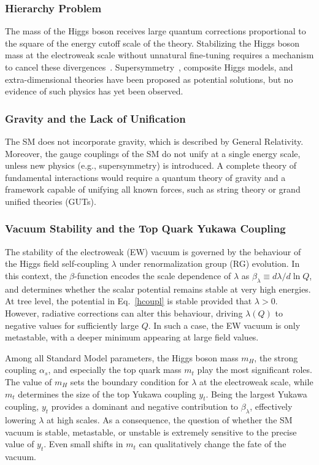 \subsubsection*{Hierarchy Problem}

The mass of the Higgs boson receives large quantum corrections proportional to the square of the energy cutoff scale of the theory. Stabilizing the Higgs boson mass at the electroweak scale without unnatural fine-tuning requires a mechanism to cancel these divergences~\cite{Weinberg:1975gm,Gildener:1976ai,Weinberg:1979bn,Susskind:1978ms}. Supersymmetry~\cite{Dimopoulos:1981zb,Witten:1981nf,Dine:1981za,Dimopoulos:1981au,Sakai:1981gr,Kaul:1981hi}, composite Higgs models, and extra-dimensional theories have been proposed as potential solutions, but no evidence of such physics has yet been observed.

\subsubsection*{Gravity and the Lack of Unification}

The SM does not incorporate gravity, which is described by General Relativity. Moreover, the gauge couplings of the SM do not unify at a single energy scale, unless new physics (e.g., supersymmetry) is introduced. A complete theory of fundamental interactions would require a quantum theory of gravity and a framework capable of unifying all known forces, such as string theory or grand unified theories (GUTs).

\subsubsection*{Vacuum Stability and the Top Quark Yukawa Coupling}

The stability of the electroweak (EW) vacuum is governed by the behaviour of the Higgs field self-coupling $\lambda$ under renormalization group (RG) evolution. In this context, the $\beta$-function encodes the scale dependence of $\lambda$ as
$\beta_\lambda \equiv d\lambda/ d \ln Q$, and determines whether the scalar potential remains stable at very high energies. At tree level, the potential in Eq.~\ref{hcoupl} is stable provided that $\lambda>0$. However, radiative corrections can alter this behaviour, driving $\lambda(Q)$ to negative values for sufficiently large $Q$. In such a case, the EW vacuum is only metastable, with a deeper minimum appearing at large field values.

Among all Standard Model parameters, the Higgs boson mass $m_H$, the strong coupling $\alpha_s$, and especially the top quark mass $m_t$ play the most significant roles. The value of $m_H$ sets the boundary condition for $\lambda$ at the electroweak scale, while $m_t$ determines the size of the top Yukawa coupling $y_t$. Being the largest Yukawa coupling, $y_t$ provides a dominant and negative contribution to $\beta_\lambda$, effectively lowering $\lambda$ at high scales. As a consequence, the question of whether the SM vacuum is stable, metastable, or unstable is extremely sensitive to the precise value of $y_t$. Even small shifts in $m_t$ can qualitatively change the fate of the vacuum.

